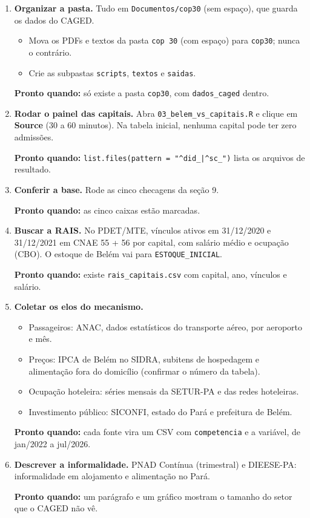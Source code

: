 \documentclass[11pt,a4paper]{article}
\newcommand{\pronto}[1]{\par\smallskip\noindent\textcolor{verde}{\textbf{Pronto quando:}} #1}
\begin{document}
\begin{enumerate}[label=\textbf{\arabic*.}, leftmargin=*, itemsep=6pt]
\item \textbf{Organizar a pasta.} Tudo em \texttt{Documentos/cop30} (sem espaço), que guarda os dados do CAGED.
  \begin{itemize}
    \item Mova os PDFs e textos da pasta \texttt{cop 30} (com espaço) para \texttt{cop30}; nunca o contrário.
    \item Crie as subpastas \texttt{scripts}, \texttt{textos} e \texttt{saidas}.
  \end{itemize}
  \pronto{só existe a pasta \texttt{cop30}, com \texttt{dados\_caged} dentro.}

\item \textbf{Rodar o painel das capitais.} Abra \texttt{03\_belem\_vs\_capitais.R} e clique em
  \textbf{Source} (30 a 60 minutos). Na tabela inicial, nenhuma capital pode ter zero admissões.
  \pronto{\texttt{list.files(pattern = "\^{}did\_|\^{}sc\_")} lista os arquivos de resultado.}

\item \textbf{Conferir a base.} Rode as cinco checagens da seção 9.
  \pronto{as cinco caixas estão marcadas.}

\item \textbf{Buscar a RAIS.} No PDET/MTE, vínculos ativos em 31/12/2020 e 31/12/2021 em CNAE 55 + 56
  por capital, com salário médio e ocupação (CBO). O estoque de Belém vai para \texttt{ESTOQUE\_INICIAL}.
  \pronto{existe \texttt{rais\_capitais.csv} com capital, ano, vínculos e salário.}

\item \textbf{Coletar os elos do mecanismo.}
  \begin{itemize}
    \item Passageiros: ANAC, dados estatísticos do transporte aéreo, por aeroporto e mês.
    \item Preços: IPCA de Belém no SIDRA, subitens de hospedagem e alimentação fora do domicílio
          (confirmar o número da tabela).
    \item Ocupação hoteleira: séries mensais da SETUR-PA e das redes hoteleiras.
    \item Investimento público: SICONFI, estado do Pará e prefeitura de Belém.
  \end{itemize}
  \pronto{cada fonte vira um CSV com \texttt{competencia} e a variável, de jan/2022 a jul/2026.}

\item \textbf{Descrever a informalidade.} PNAD Contínua (trimestral) e DIEESE-PA: informalidade em
  alojamento e alimentação no Pará.
  \pronto{um parágrafo e um gráfico mostram o tamanho do setor que o CAGED não vê.}


\end{enumerate}
\end{document}
